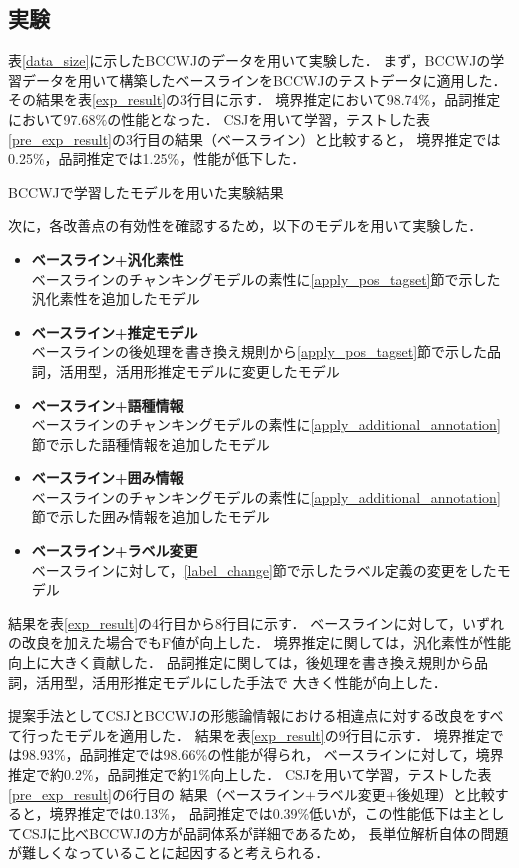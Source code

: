 \documentclass[japanese]{jnlp_1.4}
\begin{document}
\subsection{実験}
\label{luw_exp}

表\ref{data_size}に示したBCCWJのデータを用いて実験した．
まず，BCCWJの学習データを用いて構築したベースラインをBCCWJのテストデータに適用した．
その結果を表\ref{exp_result}の3行目に示す．
境界推定において98.74$\%$，品詞推定において97.68$\%$の性能となった．
CSJを用いて学習，テストした表\ref{pre_exp_result}の3行目の結果（ベースライン）と比較すると，
境界推定では0.25$\%$，品詞推定では1.25$\%$，性能が低下した．

\begin{table}[b]
\caption{BCCWJで学習したモデルを用いた実験結果}
\label{exp_result}

\end{table}

次に，各改善点の有効性を確認するため，以下のモデルを用いて実験した．
\begin{itemize}
\item {\bf ベースライン+汎化素性} \\
ベースラインのチャンキングモデルの素性に\ref{apply_pos_tagset}節で示した汎化素性を追加したモデル
\item {\bf ベースライン+推定モデル} \\
ベースラインの後処理を書き換え規則から\ref{apply_pos_tagset}節で示した品詞，活用型，活用形推定モデルに変更したモデル
\item {\bf ベースライン+語種情報} \\
ベースラインのチャンキングモデルの素性に\ref{apply_additional_annotation}節で示した語種情報を追加したモデル
\item {\bf ベースライン+囲み情報} \\
ベースラインのチャンキングモデルの素性に\ref{apply_additional_annotation}節で示した囲み情報を追加したモデル
\item {\bf ベースライン+ラベル変更} \\
ベースラインに対して，\ref{label_change}節で示したラベル定義の変更をしたモデル
\end{itemize}
結果を表\ref{exp_result}の4行目から8行目に示す．
ベースラインに対して，いずれの改良を加えた場合でもF値が向上した．
境界推定に関しては，汎化素性が性能向上に大きく貢献した．
品詞推定に関しては，後処理を書き換え規則から品詞，活用型，活用形推定モデルにした手法で
大きく性能が向上した．

提案手法としてCSJとBCCWJの形態論情報における相違点に対する改良をすべて行ったモデルを適用した．
結果を表\ref{exp_result}の9行目に示す．
境界推定では98.93$\%$，品詞推定では98.66$\%$の性能が得られ，
ベースラインに対して，境界推定で約0.2$\%$，品詞推定で約1$\%$向上した．
CSJを用いて学習，テストした表\ref{pre_exp_result}の6行目の
結果（ベースライン+ラベル変更+後処理）と比較すると，境界推定では0.13$\%$，
品詞推定では0.39$\%$低いが，この性能低下は主としてCSJに比べBCCWJの方が品詞体系が詳細であるため，
長単位解析自体の問題が難しくなっていることに起因すると考えられる．
\end{document}
